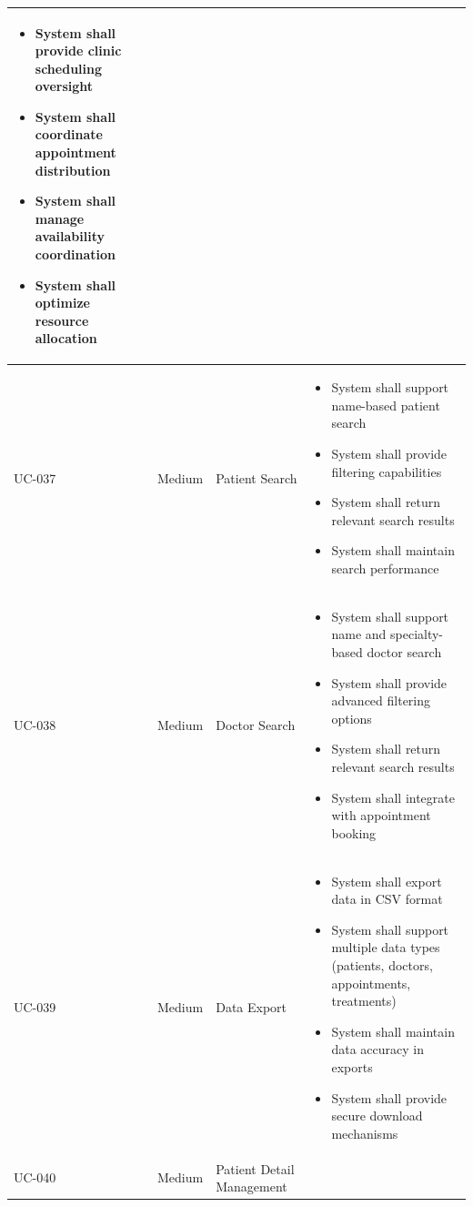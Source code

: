 \documentclass[12pt,a4paper]{article}
\begin{document}
\begin{longtable}{|p{1.2cm}|p{2.5cm}|p{3.5cm}|p{6.8cm}|}
\begin{itemize}[leftmargin=*,topsep=1pt,partopsep=0pt,parsep=0pt,itemsep=1pt]
\item System shall provide clinic scheduling oversight
\item System shall coordinate appointment distribution
\item System shall manage availability coordination
\item System shall optimize resource allocation
\end{itemize} \\
\hline
UC-037 & Medium & Patient Search & 
\begin{itemize}[leftmargin=*,topsep=1pt,partopsep=0pt,parsep=0pt,itemsep=1pt]
\item System shall support name-based patient search
\item System shall provide filtering capabilities
\item System shall return relevant search results
\item System shall maintain search performance
\end{itemize} \\
\hline
UC-038 & Medium & Doctor Search & 
\begin{itemize}[leftmargin=*,topsep=1pt,partopsep=0pt,parsep=0pt,itemsep=1pt]
\item System shall support name and specialty-based doctor search
\item System shall provide advanced filtering options
\item System shall return relevant search results
\item System shall integrate with appointment booking
\end{itemize} \\
\hline
UC-039 & Medium & Data Export & 
\begin{itemize}[leftmargin=*,topsep=1pt,partopsep=0pt,parsep=0pt,itemsep=1pt]
\item System shall export data in CSV format
\item System shall support multiple data types (patients, doctors, appointments, treatments)
\item System shall maintain data accuracy in exports
\item System shall provide secure download mechanisms
\end{itemize} \\
\hline
UC-040 & Medium & Patient Detail Management & 
\begin{itemize}[leftmargin=*,topsep=1pt,partopsep=0pt,parsep=0pt,itemsep=1pt]

\end{itemize}
\end{longtable}
\end{document}
